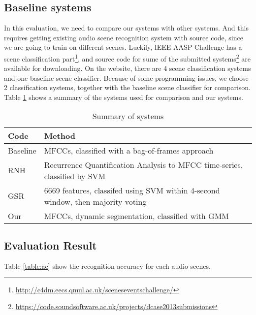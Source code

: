 \subsection{Baseline systems}
In this evaluation, we need to compare our systems with other systems. 
And this requires getting existing audio scene recognition system with source code, since we are going to train on different scenes. 
Luckily, IEEE AASP Challenge has a scene classification part\footnote{\url{http://c4dm.eecs.qmul.ac.uk/sceneseventschallenge/}}, and source code for sume of the submitted systems\footnote{\url{https://code.soundsoftware.ac.uk/projects/dcase2013submissions}} are available for downloading. 
On the website, there are 4 scene classification systems and one baseline scene classifier. 
Because of some programming issues, we choose 2 classification systems, together with the baseline scene classifier for comparison. 
Table \ref{table:systems} shows a summary of the systems used for comparison and our systems. 

\begin{table}[htb]
\caption{Summary of systems}
\begin{tabular}{ll}
\toprule
 Code & Method \\
\bottomrule
 Baseline & MFCCs, classified with a bag-of-frames approach \\ 
 RNH & Recurrence Quantification Analysis to MFCC time-series, classified by SVM \\ 
 GSR & 6669 features, classifed using SVM within 4-second window, then majority voting \\
 Our & MFCCs, dynamic segmentation, classified with GMM \\ 
\bottomrule
\end{tabular}
\label{table:systems}
\end{table}

\subsection{Evaluation Result}
Table \ref{table:ac} show the recognition accuracy for each audio scenes. 

